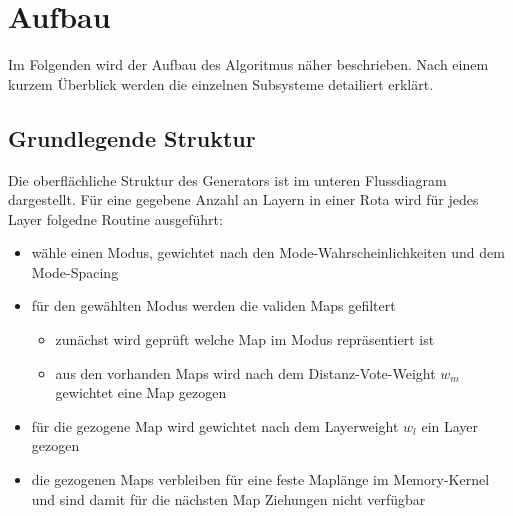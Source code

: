 \section{Aufbau}
    Im Folgenden wird der Aufbau des Algoritmus näher beschrieben. 
    Nach einem kurzem Überblick werden die einzelnen Subsysteme detailiert erklärt.
    \subsection{Grundlegende Struktur}
    Die oberflächliche Struktur des Generators ist im unteren Flussdiagram dargestellt. 
    Für eine gegebene Anzahl an Layern in einer Rota wird für jedes Layer folgedne Routine ausgeführt:
    \begin{itemize}
        \item wähle einen Modus, gewichtet nach den Mode-Wahrscheinlichkeiten und dem Mode-Spacing
        \item für den gewählten Modus werden die validen Maps gefiltert
        \begin{itemize}
            \item zunächst wird geprüft welche Map im Modus repräsentiert ist
            \item aus den vorhanden Maps wird nach dem Distanz-Vote-Weight $w_m$ gewichtet eine Map gezogen
        \end{itemize}
        \item für die gezogene Map wird gewichtet nach dem Layerweight $w_l$ ein Layer gezogen
        \item die gezogenen Maps verbleiben für eine feste Maplänge im Memory-Kernel und sind damit für die nächsten Map Ziehungen nicht verfügbar
    \end{itemize}
